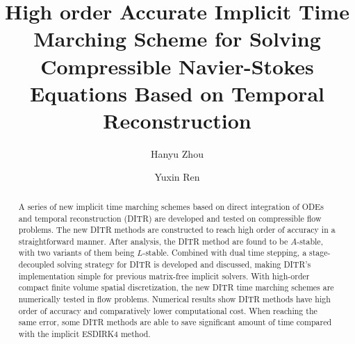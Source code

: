 \documentclass[preprint,12pt]{elsarticle}
\begin{document}
\begin{frontmatter}


    \title{High order Accurate Implicit Time Marching Scheme for
        Solving Compressible Navier-Stokes Equations Based on Temporal
        Reconstruction}




    \author[THUDEM]{Hanyu Zhou}
    \author[THUDEM]{Yuxin Ren}




    \begin{abstract}
        A series of new implicit time marching schemes based on direct integration of ODEs and temporal 
        reconstruction (DITR) are developed and tested on compressible flow problems. 
        The new DITR methods are constructed to reach high order of accuracy
        in a straightforward manner. 
        After analysis, the DITR method are found to be 
        $A$-stable, with two variants of them being $L$-stable. 
        Combined with dual time stepping, a stage-decoupled solving strategy for DITR is 
        developed and discussed, making DITR's implementation simple for previous matrix-free 
        implicit solvers. 
        With high-order compact finite volume spatial  discretization, 
        the new DITR time marching schemes are numerically tested in flow problems.
        Numerical results show DITR methods have high order of accuracy and 
        comparatively lower computational cost. 
        When reaching the same error, some DITR methods are able to save 
        significant amount of time compared with the implicit ESDIRK4 method. 


\end{abstract}
\end{frontmatter}
\end{document}
